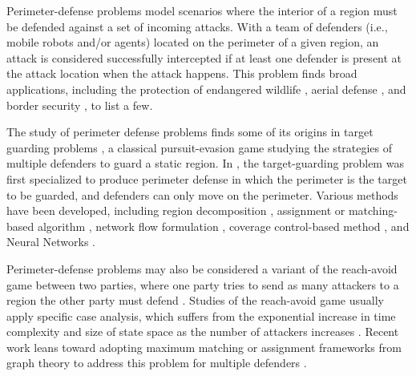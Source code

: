 Perimeter-defense problems model scenarios where the interior of a region must be defended against a set of incoming attacks.
%
With a team of defenders (i.e., mobile robots and/or agents) located on the perimeter of a given region, an attack is considered successfully intercepted if at least one defender is present at the attack location when the attack happens. 
%
This problem finds broad applications, including the protection of endangered wildlife \cite{haksar2020spatial}, aerial defense \cite{lykou2020defending, lee2020perimeter}, and border security \cite{agmon2008multi, fengyu2020optimally}, to list a few. 

The study of perimeter defense problems finds some of its origins in target guarding problems \cite{rufus1965}, a classical pursuit-evasion game studying the strategies of multiple defenders to guard a static region.
%
In \cite{shishika2018local}, the target-guarding problem was first specialized to produce perimeter defense in which the perimeter is the target to be guarded, and defenders can only move on the perimeter. 
%
Various methods have been developed, including region decomposition \cite{shishika2018local}, assignment or matching-based algorithm \cite{shishika2020cooperative}, network flow formulation \cite{chen2021optimal}, coverage control-based method \cite{macharet2020adaptive}, 
and Neural Networks \cite{lee2023graph, paulos2019decentralization}.

Perimeter-defense problems may also be considered a variant of the reach-avoid game between two parties, where one party tries to send as many attackers to a region the other party must defend \cite{rufus1965}. 
%
Studies of the reach-avoid game usually apply specific case analysis, which suffers from the exponential increase in time complexity and size of state space as the number of attackers increases \cite{margellos2011hamilton, zhou2012general, yan2018reach}. 
%
Recent work leans toward adopting maximum matching or assignment frameworks from graph theory to address this problem for multiple defenders \cite{chen2014path, chen2014multiplayer, yan2019matching}.


